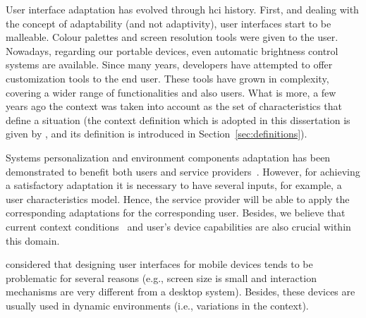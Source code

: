 User interface adaptation has evolved through \ac{hci} history. First, and 
dealing with the concept of adaptability (and not adaptivity), user interfaces 
start to be malleable. Colour palettes and screen resolution tools were given to 
the user. Nowadays, regarding our portable devices, even automatic brightness 
control systems are available. Since many years, developers have attempted to 
offer customization tools to the end user. These tools have grown in complexity, 
covering a wider range of functionalities and also users. What is more, a few 
years ago the context was taken into account as the set of characteristics that 
define a situation (the context definition which is adopted in this dissertation
is given by \citet{dey_understanding_2001}, and its definition is introduced
in Section~\ref{sec:definitions}).

Systems personalization and environment components adaptation has been demonstrated
to benefit both users and service providers~\citep{kobsa_generic_2001}. However, for
achieving a satisfactory adaptation it is necessary to have several inputs, for example,
a user characteristics model. Hence, the service provider will be able to apply the
corresponding adaptations for the corresponding user. Besides, we believe that current
context conditions~\citep{jameson_modelling_2001} and user's device capabilities are also
crucial within this domain. 

\citet{nilsson_model_based_2006} considered that designing user interfaces for
mobile devices tends to be problematic for several reasons (e.g., screen size is
small and interaction mechanisms are very different from a desktop system). Besides,
these devices are usually used in dynamic environments (i.e., variations in the
context). 


